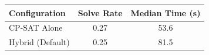 \begin{tabular}{lcc}
\toprule
Configuration & Solve Rate & Median Time (s) \\
\midrule
CP-SAT Alone & 0.27 & 53.6 \\
Hybrid (Default) & 0.25 & 81.5 \\
\bottomrule
\end{tabular}
